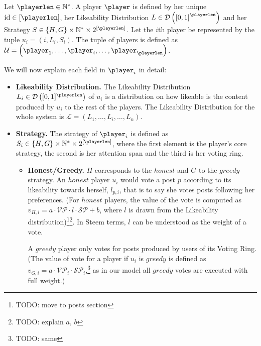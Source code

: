 \begin{definition}[Player]
  Let $\playerlen \in \mathbb{N}^{*}$. A player $\player$ is defined by her
  unique $\mathrm{id} \in \left[\playerlen\right]$, her Likeability
  Distribution $L \in \mathcal{D} \left(\left[0, 1\right]^\playerlen\right)$
  and her Strategy $S \in \left\{H, G\right\} \times \mathbb{N}^* \times
  2^{\left[\playerlen\right]}$. Let the $i$th player be represented by the
  tuple $u_i = \left(i, L_i, S_i\right)$. The tuple of players is defined as
  $\mathcal{U} = \left(\player_1, \dots, \player_i, \dots,
  \player_\playerlen\right)$.

  We will now explain each field in $\player_i$ in detail:
  \begin{itemize}
    \item \textbf{Likeability Distribution.} The Likeability Distribution
    $L_i \in \mathcal{D}\left([0,1]^\playerlen\right)$ of $u_i$ is a
    distribution on how likeable is the content produced by $u_i$ to the
    rest of the players. The Likeability Distribution for the whole system
    is $\mathcal{L} = \left(L_1, \dots, L_i, \dots, L_n\right)$.

    \item \textbf{Strategy.} The strategy of $\player_i$ is defined as $S_i
    \in \lbrace H, G \rbrace \times \mathbb{N}^* \times
    2^{\left[\playerlen\right]}$, where the first element is the player's
    core strategy, the second is her attention span and the third is her
    voting ring.
    \begin{itemize}
      \item \textbf{Honest/Greedy.} $H$ corresponds to the $honest$ and $G$
      to the $greedy$ strategy. An $honest$ player $u_i$ would vote a post
      $p$ according to its likeability towards herself, $l_{p, i}$, that is
      to say she votes posts following her preferences. (For $honest$
      players, the value of the vote is computed as $v_{H,i} = a \cdot
      \mathcal{VP} \cdot l \cdot \mathcal{SP} + b$, where $l$ is drawn from
      the Likeability distribution)\footnote{TODO: move to posts
      section}\fnmsep\footnote{TODO: explain $a$, $b$}. In Steem terms, $l$
      can be understood as the weight of a vote.

      A $greedy$ player only votes for posts produced by users of its Voting
      Ring. (The value of vote for a player if $u_i$ is $greedy$ is defined
      as $v_{G,i} = a \cdot \mathcal{VP}_i \cdot
      \mathcal{SP}_i$,\footnote{TODO: same} as in our model all $greedy$
      votes are executed with full weight.)


\end{itemize}
\end{itemize}
\end{definition}
